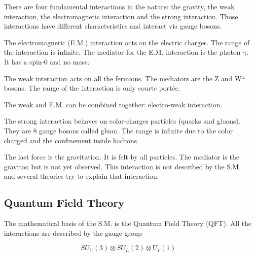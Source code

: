     There are four fundamental interactions in the nature: the gravity, the weak interaction, the electromagnetic interaction and the strong interaction.
    Those interactions have different characteristics and interact via gauge bosons.
    
    The electromagnetic (E.M.) interaction acts on the electric charges. 
    The range of the interaction is infinite. 
    The mediator for the E.M. interaction is the photon $\gamma$.
    It has a spin-0 and no mass. 
    
    The weak interaction acts on all the fermions.
    The mediators are the Z and W$^\pm$ bosons.
    The range of the interaction is only courte portée.

    The weak and E.M. can be combined together: electro-weak interaction.

    The strong interaction behaves on color-charges particles (quarks and gluons).
    They are 8 gauge bosons called gluon.
    The range is infinite due to the color charged and the confinement inside hadrons.

    The last force is the gravitation. 
    It is felt by all particles.
    The mediator is the graviton but is not yet observed.
    This interaction is not described by the S.M. and several theories try to explain that interaction.


    \subsection{Quantum Field Theory}

	The mathematical basis of the S.M. is the Quantum Field Theory (QFT). All the interactions are described by the gauge group 
    
      \begin{equation}
    	SU_C(3) \otimes SU_L(2) \otimes U_Y(1)
	  \end{equation}
    
